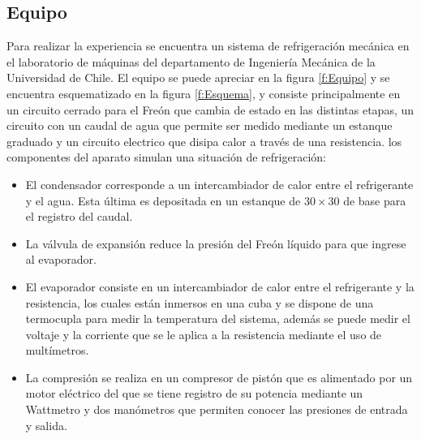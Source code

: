 \documentclass[11pt,letterpaper]{extarticle}        %
\numberwithin{equation}{section}                    %
\begin{document}
\subsection{Equipo}
Para realizar la experiencia se encuentra un sistema de refrigeración mecánica en el laboratorio de máquinas del departamento de Ingeniería Mecánica de la Universidad de Chile. El equipo se puede apreciar en la figura \ref{f:Equipo} y se encuentra esquematizado en la figura \ref{f:Esquema}, y consiste principalmente en un circuito cerrado para el Freón que cambia de estado en las distintas etapas, un circuito con un caudal de agua que permite ser medido mediante un estanque graduado y un circuito electrico que disipa calor a través de una resistencia. los componentes del aparato simulan una situación de refrigeración:

\begin{itemize}
\item El condensador corresponde a un intercambiador de calor entre el refrigerante y el agua. Esta última es depositada en un estanque de $30\times30$ de base para el registro del caudal.
\item La válvula de expansión reduce la presión del Freón líquido para que ingrese al evaporador.
\item El evaporador consiste en un intercambiador de calor entre el refrigerante y la resistencia, los cuales están inmersos en una cuba y se dispone de una termocupla para medir la temperatura del sistema, además se puede medir el voltaje y la corriente que se le aplica a la resistencia mediante el uso de multímetros.
\item La compresión se realiza en un compresor de pistón que es alimentado por un motor eléctrico del que se tiene registro de su potencia mediante un Wattmetro y dos manómetros que permiten conocer las presiones de entrada y salida.
\end{itemize}
\end{document}
